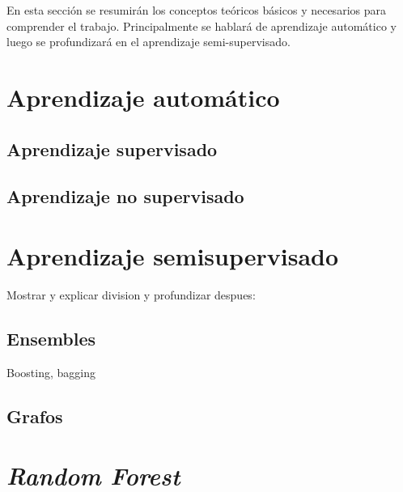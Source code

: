 
En esta sección se resumirán los conceptos teóricos básicos y necesarios para comprender el trabajo. Principalmente se hablará de aprendizaje automático y luego se profundizará en el aprendizaje semi-supervisado.

\section{Aprendizaje automático}



\subsection{Aprendizaje supervisado}

\subsection{Aprendizaje no supervisado}


\section{Aprendizaje semisupervisado}
Mostrar y explicar division y profundizar despues:
\subsection{Ensembles}
Boosting, bagging
\subsection{Grafos}



\section{\textit{Random Forest}}




